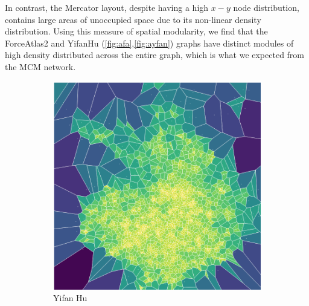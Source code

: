 In contrast, the Mercator layout, despite having a high $x-y$ node distribution, contains large areas of unoccupied space due to its non-linear density distribution. Using this measure of spatial modularity, we find that the ForceAtlas2 and YifanHu (\autoref{fig:afa},\autoref{fig:ayfan}) graphs have distinct modules of high density distributed across the entire graph, which is what we expected from the MCM network.



\begin{figure}[H]
     \centering
    \begin{subfigure}[b]{.45\textwidth}
         \centering \includegraphics[width=\textwidth,angle=90]{figures_c1/area/fill_yfan_aphh.png}
         \caption{Yifan Hu}
         \label{fig:ayfan}
     \end{subfigure}
     \begin{subfigure}[b]{.45\textwidth}

\end{subfigure}
\end{figure}
